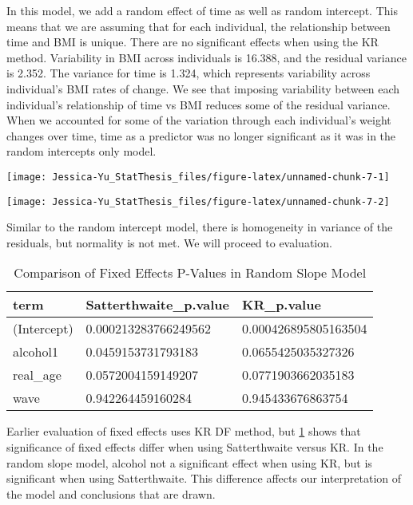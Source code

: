 \documentclass[12pt, twoside]{amherstthesis}
\begin{document}
In this model, we add a random effect of time as well as random intercept. This means that we are assuming that for each individual, the relationship between time and BMI is unique. There are no significant effects when using the KR method. Variability in BMI across individuals is 16.388, and the residual variance is 2.352. The variance for time is 1.324, which represents variability across individual's BMI rates of change. We see that imposing variability between each individual's relationship of time vs BMI reduces some of the residual variance. When we accounted for some of the variation through each individual's weight changes over time, time as a predictor was no longer significant as it was in the random intercepts only model.
\begin{center}\texttt{[image: Jessica-Yu\_StatThesis\_files/figure-latex/unnamed-chunk-7-1]} \end{center}
\begin{center}\texttt{[image: Jessica-Yu\_StatThesis\_files/figure-latex/unnamed-chunk-7-2]} \end{center}

Similar to the random intercept model, there is homogeneity in variance of the residuals, but normality is not met. We will proceed to evaluation.
\begin{table}[H]

\caption{\label{tab:compareslope}Comparison of Fixed Effects P-Values in Random Slope Model}
\centering
\begin{tabular}[t]{l|l|l}
\hline
term & Satterthwaite\_p.value & KR\_p.value\\
\hline
(Intercept) & 0.000213283766249562 & 0.000426895805163504\\
\hline
alcohol1 & 0.0459153731793183 & 0.0655425035327326\\
\hline
real\_age & 0.0572004159149207 & 0.0771903662035183\\
\hline
wave & 0.942264459160284 & 0.945433676863754\\
\hline
\end{tabular}
\end{table}
Earlier evaluation of fixed effects uses KR DF method, but \ref{tab:compareslope} shows that significance of fixed effects differ when using Satterthwaite versus KR. In the random slope model, alcohol not a significant effect when using KR, but is significant when using Satterthwaite. This difference affects our interpretation of the model and conclusions that are drawn.
\end{document}
